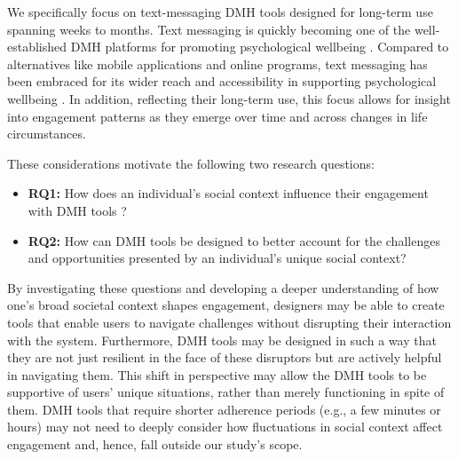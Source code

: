 We specifically focus on text-messaging DMH tools designed for long-term use spanning weeks to months. 
Text messaging is quickly becoming one of the well-established DMH platforms for promoting psychological wellbeing \cite{bhattacharjee2023investigating,  kornfield2022meeting}. Compared to alternatives like mobile applications and online programs, text messaging has been embraced for its wider reach and accessibility in supporting psychological wellbeing \cite{kretzschmar2019can, chikersal2020understanding, rathbone2017use, inkster2018empathy, morris2018towards}.
In addition, reflecting their long-term use, this focus allows for insight into engagement patterns as they emerge over time and across changes in life circumstances.

These considerations motivate the following two research questions:

\begin{itemize}
\item \textbf{RQ1:} How does an individual's social context influence their engagement with DMH tools ?
\item \textbf{RQ2:} How can  DMH tools be designed to better account for the challenges and opportunities presented by an individual's unique social context?
\end{itemize}

\noindent
By investigating these questions and developing a deeper understanding of how one's broad societal context shapes engagement, designers may be able to create tools that enable users to navigate challenges without disrupting their interaction with the system. %
Furthermore, DMH tools may be designed in such a way that they are not just resilient in the face of these disruptors but are actively helpful in navigating them. This shift in perspective may allow the DMH tools to be supportive of users' unique situations, rather than merely functioning in spite of them. DMH tools that require shorter adherence periods (e.g., a few minutes or hours) may not need to deeply consider how fluctuations in social context affect engagement and, hence, fall outside our study's scope.

